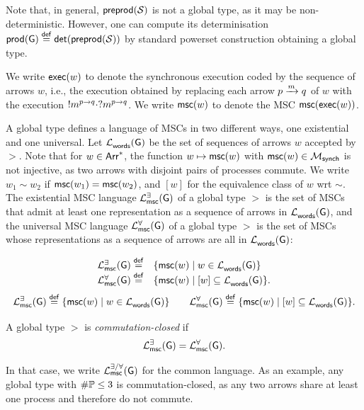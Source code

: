 Note that, in general,  $\preproductof{\cfsms}$ is not a global type, as it may be non-deterministic. 
However, one can compute its determinisation $\productof{\gt}\eqdef\detof{\preproductof{\cfsms}}$ by standard powerset construction obtaining a  global type.

We write $\labeltoexec{w}$ to denote the synchronous execution coded by the sequence of
arrows $w$, i.e., the execution obtained by replacing each arrow $\marrow{p}{q}{m}$ of $w$ with the 
execution $\send{p}{q}{m}\cdot\recv{p}{q}{m}$.
We write $\labeltomsc{w}$ to denote the MSC $\mscof{\labeltoexec{w}}$.

A global type defines a language of MSCs in two different ways, one existential and one universal.
Let $\labellanguageof{\gt}$ be the set of 
sequences of arrows $w$ accepted by $\gt$.
Note that for 
$w\in\Arrows^*$, the function $w \mapsto\labeltomsc{w}$ with $ \labeltomsc{w}\in\mscsetofmodel{\synchmodel}$ is not injective, as two arrows with disjoint pairs of processes
commute. We write $w_1\sim w_2$ if 
$\labeltomsc{w_1}=\labeltomsc{w_2}$, and
$[w]$ for the equivalence class of $w$ wrt $\sim$.
The existential MSC language $\existentialmsclanguageof{\gt}$ of a global type $\gt$ is the set 
of MSCs that admit at least one representation as a sequence of arrows in $\labellanguageof{\gt}$,
and the universal MSC language $\universalmsclanguageof{\gt}$ of a global type $\gt$ is the set
of MSCs whose representations as a sequence of arrows are 
all in $\labellanguageof{\gt}$:

\iftwocolumns
$$
\begin{array}{rl}
\existentialmsclanguageof{\gt}\eqdef & \{\labeltomsc{w}\mid w\in\labellanguageof{\gt}\}\\
\universalmsclanguageof{\gt}\eqdef & \{\labeltomsc{w}\mid [w]\subseteq\labellanguageof{\gt}\}.
\end{array}
$$
\else
$$
\existentialmsclanguageof{\gt}\eqdef \{\labeltomsc{w}\mid w\in\labellanguageof{\gt}\}
\qquad
\universalmsclanguageof{\gt}\eqdef\{\labeltomsc{w}\mid [w]\subseteq\labellanguageof{\gt}\}.
$$
\fi

\begin{definition}
    A global type $\gt$ is \emph{commutation-closed} if 
    $$
    \existentialmsclanguageof{\gt}=\universalmsclanguageof{\gt}.
    $$
\end{definition} 
In that case, we write $\msclanguageofcc{\gt}{}$ for the common language. 
As an example, any global type with $\#\Procs\leq 3$ is commutation-closed, as 
any two arrows share at least one process and therefore do not commute.

